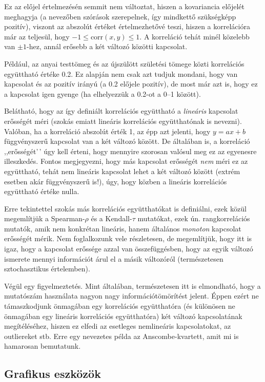 \documentclass[
]{book}
\begin{document}
Ez az előjel értelmezésén semmit nem változtat, hiszen a kovariancia előjelét meghagyja (a nevezőben szórások szerepelnek, így mindkettő szükségképp pozitív), viszont az abszolút értéket értelmezhetővé teszi, hiszen a korrelációra már az teljesül, hogy \(-1 \leq \mathrm{corr}\left(x,y\right) \leq 1\). A korreláció tehát minél közelebb van \(\pm 1\)-hez, annál erősebb a két változó közötti kapcsolat.

Például, az anyai testtömeg és az újszülött születési tömege közti korrelációs együttható értéke 0.2. Ez alapján nem csak azt tudjuk mondani, hogy van kapcsolat és az pozitív irányú (a 0.2 előjele pozitív), de most már azt is, hogy ez a kapcsolat igen gyenge (ha elhelyezzük a 0.2-ot a 0--1 között).

Belátható, hogy az így definiált korrelációs együttható a \emph{lineáris} kapcsolat erősségét méri (szokás emiatt lineáris korrelációs együtthatónak is nevezni). Valóban, ha a korreláció abszolút érték 1, az épp azt jelenti, hogy \(y=ax+b\) függvényszerű kapcsolat van a két változó között. De általában is, a korreláció ,,erősségét'\,' úgy kell érteni, hogy mennyire szorosan valósul meg ez az egyenesre illeszkedés. Fontos megjegyezni, hogy más kapcsolat erősségét \emph{nem} méri ez az együttható, tehát nem lineáris kapcsolat lehet a két változó között (extrém esetben akár függvényszerű is!), úgy, hogy közben a lineáris korrelációs együttható értéke nulla.

Erre tekintettel szokás más korrelációs együtthatókat is definiálni, ezek közül megemlítjük a Spearman-\(\rho\) és a Kendall-\(\tau\) mutatókat, ezek ún. rangkorrelációs mutatók, amik nem konkrétan lineáris, hanem általános \emph{monoton} kapcsolat erősségét mérik. Nem foglalkozunk vele részletesen, de megemlítjük, hogy itt is igaz, hogy a kapcsolat erőssége azzal van összefüggésben, hogy az egyik változó ismerete mennyi információt árul el a másik változóról (természetesen sztochasztikus értelemben).

Végül egy figyelmeztetés. Mint általában, természetesen itt is elmondható, hogy a mutatószám használata nagyon nagy információtömörítést jelent. Éppen ezért ne támaszkodjunk önmagában egy korrelációs együtthatóra (és különösen ne önmagában egy lineáris korrelációs együtthatóra) két változó kapcsolatának megítéléséhez, hiszen ez elfedi az esetleges nemlineáris kapcsolatokat, az outliereket stb. Erre egy nevezetes példa az Anscombe-kvartett, amit mi is hamarosan bemutatunk.

\hypertarget{deskriptivmennyketvaltvaltgrafikus}{%
\subsection{Grafikus eszközök}\label{deskriptivmennyketvaltvaltgrafikus}}
\end{document}
